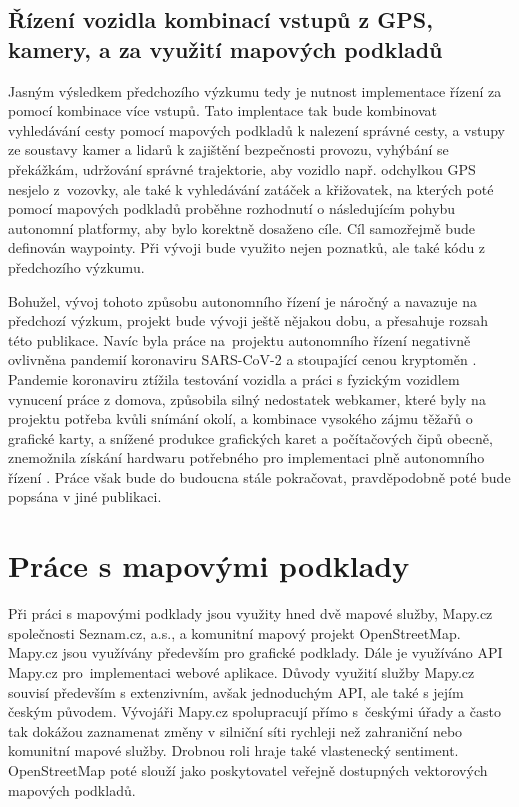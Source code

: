 \documentclass[czech, bachelor]{diploma}
\begin{document}
\section{Řízení vozidla kombinací vstupů z GPS, kamery, a za využití mapových podkladů} \label{combination-of-driving-inputs}

Jasným výsledkem předchozího výzkumu tedy je nutnost implementace řízení za pomocí kombinace více vstupů. Tato implentace tak bude
kombinovat vyhledávání cesty pomocí mapových podkladů k nalezení správné cesty, a vstupy ze soustavy kamer a lidarů k zajištění
bezpečnosti provozu, vyhýbání se překážkám, udržování správné trajektorie, aby vozidlo např. odchylkou GPS nesjelo z~vozovky,
ale také k vyhledávání zatáček a křižovatek, na kterých poté pomocí mapových podkladů proběhne rozhodnutí o následujícím pohybu
autonomní platformy, aby bylo korektně dosaženo cíle. Cíl samozřejmě bude definován waypointy. Při vývoji bude využito nejen
poznatků, ale také kódu z předchozího výzkumu.

Bohužel, vývoj tohoto způsobu autonomního řízení je náročný a navazuje na předchozí výzkum, projekt bude vývoji ještě nějakou
dobu, a přesahuje rozsah této publikace. Navíc byla práce na~projektu autonomního řízení negativně ovlivněna pandemií koronaviru
SARS-CoV-2 \cite{pandemic-source} a stoupající cenou kryptoměn \cite{bitcoin-rally-source}. Pandemie koronaviru ztížila testování
vozidla a práci s fyzickým vozidlem vynucení práce z domova, způsobila silný nedostatek webkamer, které byly na projektu potřeba
kvůli snímání okolí, a kombinace vysokého zájmu těžařů o grafické karty, a snížené produkce grafických karet a počítačových čipů
obecně, znemožnila získání hardwaru potřebného pro implementaci plně autonomního řízení
\cite{bitcoin-miners-gpu-source,webcam-shortage-source}. Práce však bude do budoucna stále pokračovat, pravděpodobně poté bude
popsána v jiné publikaci.

\chapter{Práce s mapovými podklady} \label{osm-chapter}

Při práci s mapovými podklady jsou využity hned dvě mapové služby, Mapy.cz společnosti Seznam.cz, a.s., a komunitní mapový projekt
OpenStreetMap. Mapy.cz jsou využívány především pro grafické podklady. Dále je využíváno API Mapy.cz pro~implementaci webové
aplikace. Důvody využití služby Mapy.cz souvisí především s extenzivním, avšak jednoduchým API, ale také s jejím českým původem.
Vývojáři Mapy.cz spolupracují přímo s~českými úřady a často tak dokážou zaznamenat změny v silniční síti rychleji než zahraniční
nebo komunitní mapové služby. Drobnou roli hraje také vlastenecký sentiment. OpenStreetMap poté slouží jako poskytovatel veřejně
dostupných vektorových mapových podkladů.
\end{document}

